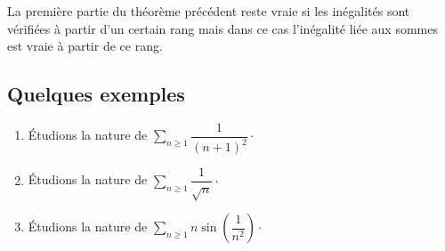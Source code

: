 \documentclass[french,11pt,twoside]{VcCours}
\newcommand{\Sum}[2]{\ensuremath{\textstyle{\sum\limits_{#1}^{#2}}}}
\begin{document}
\begin{Remarque}{} La première partie du théorème précédent reste vraie si les inégalités sont vérifiées à partir d'un certain rang mais dans ce cas l'inégalité liée aux sommes est vraie à partir de ce rang.
\end{Remarque}


\subsection{Quelques exemples}

\newpage
\begin{Exemples}
\begin{enumerate}
	\item Étudions la nature de $\Sum{n \geq 1}{} \dfrac{1}{(n+1)^2}\cdot$

\vspace{3cm}
\item Étudions la nature de $\Sum{n \geq 1}{} \dfrac{1}{\sqrt{n}} \cdot$

\vspace{3cm}
%
\item Étudions la nature de $\Sum{n \geq 1}{} n \sin \left(\dfrac{1}{n^2}\right) \cdot$

\vspace{3cm}
%
\end{enumerate}
\end{Exemples}
\end{document}
